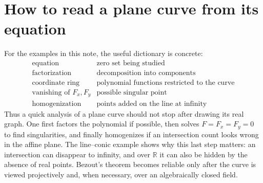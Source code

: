 \section{How to read a plane curve from its equation}

For the examples in this note, the useful dictionary is concrete:
\[
\begin{array}{c|c}
\text{equation} & \text{zero set being studied}\\
\text{factorization} & \text{decomposition into components}\\
\text{coordinate ring} & \text{polynomial functions restricted to the curve}\\
\text{vanishing of }F_x,F_y & \text{possible singular point}\\
\text{homogenization} & \text{points added on the line at infinity}
\end{array}
\]
Thus a quick analysis of a plane curve should not stop after drawing its real graph.  One first factors the polynomial if possible, then solves \(F=F_x=F_y=0\) to find singularities, and finally homogenizes if an intersection count looks wrong in the affine plane.  The line--conic example shows why this last step matters: an intersection can disappear to infinity, and over \(\mathbb R\) it can also be hidden by the absence of real points.  Bezout's theorem becomes reliable only after the curve is viewed projectively and, when necessary, over an algebraically closed field.
